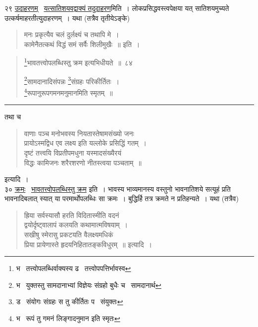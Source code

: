 \documentclass[11pt, openany]{book}
\begin{document}
२९ \underline{उदाहरणम्} \textendash\ \underline{यत्सातिशयवद्वाक्यं तदुदाहरण}मिति~। लोकप्रसिद्धवस्त्वपेक्षया यत् सातिशयमुच्यते उत्कर्षमाहरतीत्युदाहरणम्~। यथा (तत्रैव तृतीयेऽङ्के) \textendash

\begin{quote}
{\qt मनः प्रकृत्यैव चलं दुर्लक्ष्यं च तथापि मे~।\\
कामेनैतत्कथं विद्धं समं सर्वैः शिलीमुखैः~॥} इति~।
\end{quote}

\newpage

\begin{quote}
{\na \renewcommand{\thefootnote}{1}\footnote{भ \textendash\ तत्त्वोपलब्धिर्वाक्यस्य ढ \textendash\ तत्त्वोपपत्तिर्भावस्व}भावतत्त्वोपलब्धिस्तु क्रम इत्यभिधीयते~॥~८४

\renewcommand{\thefootnote}{2}\footnote{भ \textendash\ युक्तस्तु सामदानाभ्यां विज्ञेयः संग्रहो बुधैः च \textendash\ सामदानार्थ}सामदानादिसंपन्नः \renewcommand{\thefootnote}{3}\footnote{ड \textendash\ संयोगः संग्रहः स तु कीर्तितः प \textendash\ संयुक्तः}संग्रहः परिकीर्तितः~।\\
\renewcommand{\thefootnote}{4}\footnote{भ \textendash\ रूपं तु गमनं लिङ्गादनुमान इति स्मृतः}रूपानुरूपगमनमनुमानमिति स्मृतम्~॥}
\end{quote}

\hrule

\vspace{2mm}
\noindent
तथा च \textendash

\begin{quote}
{\qt वाणाः पञ्च मनोभवस्य नियतास्तेषामसंख्यो जनः\\
प्रायोऽस्मद्विध एव लक्ष्य इति यल्लोके प्रसिद्धिं गतम्~।\\
दृष्टं तत्त्वयि विप्रतीपमधुना यस्मादसंख्यैरयं\\
विद्धः कामिजनः शरैरशरणो नीतस्त्वया पञ्चताम्~॥}
\end{quote}

\noindent
इत्यादि~।\\

३० \underline{क्रमः} \textendash\ \underline{भावतत्त्वोपलब्धिस्तु क्रम} इति~। भावस्य भाव्यमानस्य वस्तुनो भावनातिशये सत्यूहं प्रति भावनादिबलात् स्यात् या परमार्थोपलब्धिः सा क्रमः~। बुद्धिर्हि तत्र क्रमते न प्रतिहन्यते~। यथा (तत्रैव) \textendash

\begin{quote}
{\qt ह्रिया सर्वस्यासौ हरति विदितास्मीति वदनं\\
द्वयोर्दृष्ट्वालापं कलयति कथामात्मविषयाम्~।\\
सखीषु स्मेरासु प्रकटयति वैलक्ष्यमधिकं\\
प्रिया प्रायेणास्ते हृदयनिहितातङ्कविधुरम्~॥} इत्यादि~।
\end{quote}
\end{document}
